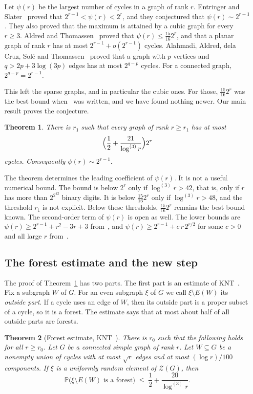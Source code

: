 \documentclass[11pt]{article}
\newtheorem{theorem}{Theorem}[section]
\theoremstyle{definition}
\theoremstyle{remark}
\newcommand{\Z}{\mathcal{Z}}
\newcommand{\PP}{\mathbb{P}}
\newcommand{\lgk}[1]{\log^{(#1)}}
\newcommand{\sm}{\setminus}
\numberwithin{equation}{section}
\begin{document}
Let $\psi(r)$ be the largest number of cycles in a graph of rank $r$. Entringer and
Slater~\cite{ES} proved that $2^{r-1}<\psi(r)<2^{r}$, and they conjectured that
$\psi(r)\sim2^{r-1}$. They also proved that the maximum is attained by a cubic graph for every
$r\ge3$. Aldred and Thomassen~\cite{AT} proved that $\psi(r)\le\frac{15}{16}2^{r}$, and that a
planar graph of rank $r$ has at most $2^{r-1}+o(2^{r-1})$ cycles. Alahmadi, Aldred, dela Cruz,
Sol\'e and Thomassen~\cite{AACST} proved that a graph with $p$ vertices and $q>2p+3\log(3p)$ edges
has at most $2^{q-p}$ cycles. For a connected graph, $2^{q-p}=2^{r-1}$.

This left the sparse graphs, and in particular the cubic ones. For those, $\frac{15}{16}2^{r}$ was
the best bound when~\cite{HK} was written, and we have found nothing newer. Our main result proves
the conjecture.

\begin{theorem}\label{thm:cycles}
There is $r_1$ such that every graph of rank $r\ge r_1$ has at most
\[
  \Bigl(\frac12+\frac{21}{\lgk{3}r}\Bigr)2^{r}
\]
cycles. Consequently $\psi(r)\sim2^{r-1}$.
\end{theorem}

The theorem determines the leading coefficient of $\psi(r)$. It is not a useful numerical bound.
The bound is below $2^{r}$ only if $\lgk3r>42$, that is, only if $r$ has more than $2^{2^{42}}$
binary digits. It is below $\frac{15}{16}2^{r}$ only if $\lgk3r>48$, and the threshold $r_1$ is not
explicit. Below these thresholds, $\frac{15}{16}2^{r}$ remains the best bound known. The
second-order term of $\psi(r)$ is open as well. The lower bounds are
$\psi(r)\ge2^{r-1}+r^{2}-3r+3$ from~\cite{ES}, and $\psi(r)\ge2^{r-1}+c\,r\,2^{r/2}$ for some $c>0$
and all large $r$ from~\cite{HK}.

\subsection{The forest estimate and the new step}

The proof of Theorem~\ref{thm:cycles} has two parts. The first part is an estimate of
KNT~\cite{KNT}. Fix a subgraph $W$ of $G$. For an even subgraph $\xi$ of $G$ we call
$\xi\sm E(W)$ its \emph{outside part}. If a cycle uses an edge of $W$, then its outside part is a
proper subset of a cycle, so it is a forest. The estimate says that at most about half of all
outside parts are forests.

\begin{theorem}[Forest estimate, KNT~\cite{KNT}]\label{thm:forest}
There is $r_0$ such that the following holds for all $r\ge r_0$. Let $G$ be a connected simple graph
of rank $r$. Let $W\subseteq G$ be a nonempty union of cycles with at most $\sqrt r$ edges and at
most $(\log r)/100$ components. If $\xi$ is a uniformly random element of $\Z(G)$, then
\begin{equation}\label{eq:forest}
  \PP\bigl(\xi\sm E(W)\text{ is a forest}\bigr)\;\le\;\frac12+\frac{20}{\lgk{3}r}.
\end{equation}
\end{theorem}
\end{document}
